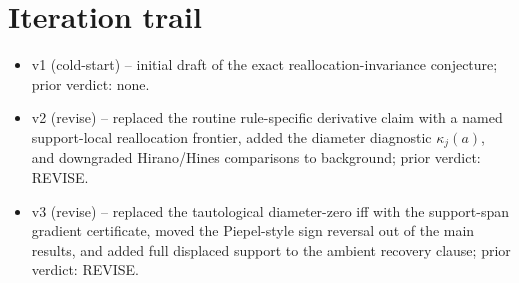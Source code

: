 \documentclass[11pt]{article}
\theoremstyle{definition}
\theoremstyle{plain}
\theoremstyle{remark}
\begin{document}
\section{Iteration trail}
\begin{itemize}[leftmargin=1.8em]
\item v1 (cold-start) -- initial draft of the exact reallocation-invariance conjecture; prior verdict: none.
\item v2 (revise) -- replaced the routine rule-specific derivative claim with a named support-local reallocation frontier, added the diameter diagnostic \(\kappa_j(a)\), and downgraded Hirano/Hines comparisons to background; prior verdict: REVISE.
\item v3 (revise) -- replaced the tautological diameter-zero iff with the support-span gradient certificate, moved the Piepel-style sign reversal out of the main results, and added full displaced support to the ambient recovery clause; prior verdict: REVISE.
\end{itemize}
\end{document}
